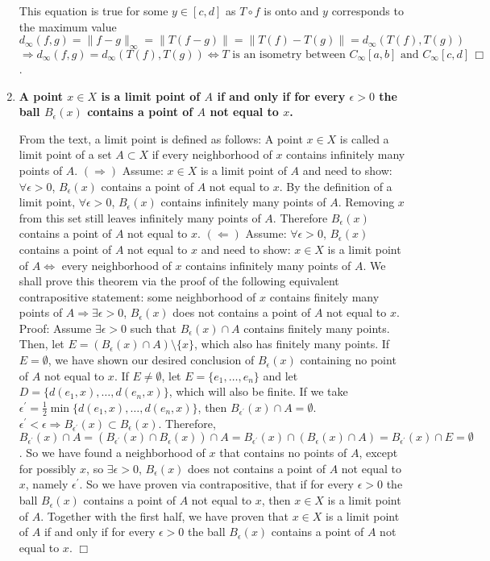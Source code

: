 \documentclass[5pt,letterpaper,reqno]{amsart}
\begin{document}
\begin{enumerate}[1.]
\begin{flushleft}
    This equation is true for some $y \in [c,d]$ as $T\circ f$ is onto and $y$ corresponds to the maximum value
    $$ d_\infty(f,g) = \|f-g\|_\infty = \|T(f-g)\| = \|T(f) - T(g)\| = d_\infty(T(f),T(g)) $$
    $$ \Rightarrow d_\infty(f,g) = d_\infty(T(f),T(g)) \Leftrightarrow T \text{ is an isometry between } C_\infty[a,b] \text{ and } C_\infty[c,d] \, \Box$$. 
\end{flushleft}
\item \textbf{A point $x\in X$ is a limit point of $A$ if and only if for every $\epsilon>0$ the ball $B_\epsilon(x)$ contains a point of $A$ not equal to $x$.}
\begin{flushleft}
    From the text, a limit point is defined as follows:  A point $x \in X$ is called a limit point of a set $A \subset X$ if every neighborhood of $x$ contains infinitely many points of $A$. \newline $(\Rightarrow)$ Assume: $x \in X$ is a limit point of $A$ and need to show: $\forall \epsilon > 0$, $B_\epsilon(x)$ contains a point of $A$ not equal to $x$. By the definition of a limit point, $\forall \epsilon > 0$, $B_\epsilon(x)$ contains infinitely many points of $A$. Removing $x$ from this set still leaves infinitely many points of $A$. Therefore $B_\epsilon(x)$ contains a point of $A$ not equal to $x$.
    \newline $(\Leftarrow)$ Assume: $\forall \epsilon > 0$, $B_\epsilon(x)$ contains a point of $A$ not equal to $x$ and need to show: $x \in X$ is a limit point of $A \Leftrightarrow$ every neighborhood of $x$ contains infinitely many points of $A$. We shall prove this theorem via the proof of the following equivalent contrapositive statement: some neighborhood of $x$ contains finitely many points of $A \Rightarrow \exists \epsilon > 0$, $B_\epsilon(x)$ does not contains a point of $A$ not equal to $x$. Proof: Assume $\exists \epsilon > 0$ such that $B_\epsilon(x) \cap A$ contains finitely many points. Then, let $E = (B_\epsilon(x) \cap A)\setminus \{x\}$, which also has finitely many points. If $E = \emptyset$, we have shown our desired conclusion of $B_\epsilon(x)$ containing no point of $A$ not equal to $x$. If $E \not= \emptyset$, let $E = \{e_1, \ldots, e_n\}$ and let $D = \{d(e_1,x), \ldots, d(e_n, x)\}$, which will also be finite. If we take $\epsilon^\prime = \frac{1}{2} \min\{d(e_1,x), \ldots, d(e_n, x)\}$, then $B_{\epsilon^\prime}(x) \cap A = \emptyset$. $\epsilon^\prime < \epsilon \Rightarrow B_{\epsilon^\prime}(x) \subset B_\epsilon(x)$. Therefore, $B_{\epsilon^\prime}(x) \cap A = (B_{\epsilon^\prime}(x) \cap B_\epsilon(x))\cap A = B_{\epsilon^\prime}(x) \cap (B_\epsilon(x)\cap A) = B_{\epsilon^\prime}(x) \cap E = \emptyset$. So we have found a neighborhood of $x$ that contains no points of $A$, except for possibly $x$, so $\exists \epsilon > 0$, $B_\epsilon(x)$ does not contains a point of $A$ not equal to $x$, namely $\epsilon^\prime$. So we have proven via contrapositive, that if for every $\epsilon>0$ the ball $B_\epsilon(x)$ contains a point of $A$ not equal to $x$, then $x\in X$ is a limit point of $A$. Together with the first half, we have proven that $x\in X$ is a limit point of $A$ if and only if for every $\epsilon>0$ the ball $B_\epsilon(x)$ contains a point of $A$ not equal to $x$. $\Box$

\end{flushleft}
\end{enumerate}
\end{document}
